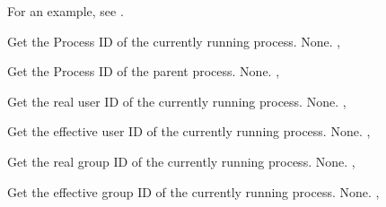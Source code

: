For an example, see .

{ Get the Process ID of the currently running process.}
{None.}
{, }




{ Get the Process ID of the parent process.}
{None.}
{, }



{ Get the real user ID of the currently running process.}
{None.}
{,  }



{ Get the effective user ID of the currently running process.}
{None.}
{,  }



{ Get the real group ID of the currently running process.}
{None.}
{,  }



{ Get the effective group ID of the currently running process.}
{None.}
{,  }



